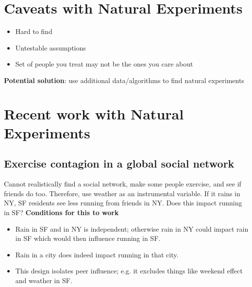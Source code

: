 \section{Caveats with Natural Experiments}

\begin{itemize}
\item Hard to find
\item Untestable assumptions 
\item Set of people you treat may not be the ones you care about 
\end{itemize}
\textbf{Potential solution}: use additional data/algorithms to find natural experiments

\section{Recent work with Natural Experiments}
\subsection{Exercise contagion in a global social network }
Cannot realistically find a social network, make some people exercise, and see if friends do too. Therefore, use weather as an instrumental variable. If it rains in NY, SF residents see less running from friends in NY. Does this impact running in SF? \newline
\newpage 
\textbf{Conditions for this to work}
\begin{itemize}
\item Rain in SF and in NY is independent; otherwise rain in NY could impact rain in SF which would then influence running in SF. 
\item Rain in a city does indeed impact running in that city.
\item This design isolates peer influence; e.g. it excludes things like weekend effect and weather in SF.
\end{itemize}

